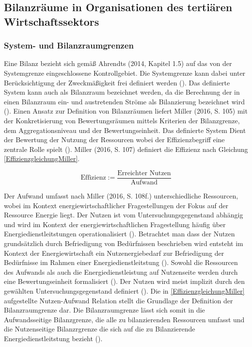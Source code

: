 \subsection{Bilanzräume in Organisationen des tertiären Wirtschaftssektors}


\subsubsection{System- und Bilanzraumgrenzen}
Eine Bilanz bezieht sich gemäß Ahrendts (2014, Kapitel 1.5) auf das von der Systemgrenze eingeschlossene Kontrollgebiet. 
Die Systemgrenze kann dabei unter Berücksichtigung der Zweckmäßigkeit frei definiert werden (\cite[Kapitel 1.5]{Ahrendts.2014}).
Das definierte System kann auch als Bilanzraum bezeichnet werden, da die Berechnung der in einen Bilanzraum ein- und austretenden Ströme als Bilanzierung bezeichnet wird (\cite[S. 65]{Rönsch.2015}).
Einen Ansatz zur Definition von Bilanzräumen liefert Miller (2016, S. 105) mit der Konkretisierung von Bewertungsräumen mittels Kriterien der Bilanzgrenze, dem 
Aggregationsniveau und der Bewertungseinheit. Das definierte System Dient der Bewertung der Nutzung der Ressourcen wobei der Effizienzbegriff eine zentrale Rolle spielt (\cite[S. 107]{Miller.2016}).
Miller (2016, S. 107) definiert die Effizienz nach Gleichung \eqref{EffizienzgleichungMiller}.

\begin{equation}
    \text{Effizienz} := \frac{\text{Erreichter Nutzen}}{\text{Aufwand}}
    \label{EffizienzgleichungMiller}
\end{equation}

Der Aufwand umfasst nach Miller (2016, S. 108f.) unterschiedliche Ressourcen, wobei im Kontext energiewirtschaftlicher Fragestellungen der Fokus auf der Ressource Energie 
liegt.
Der Nutzen ist vom Untersuchungsgegenstand abhängig und wird im Kontext der energiewirtschaftlichen 
Fragestellung häufig über Energiedienstleitstungen operationalisiert (\cite[S. 107]{Miller.2016}). Betrachtet man dass der Nutzen grundsätzlich durch Befriedigung 
von Bedürfnissen beschrieben wird entsteht im Kontext der Energiewirtschaft ein Nutzenergiebedarf zur Befriedigung der Bedürfnisse im Rahmen einer Energiedienstleitstung 
(\cite[S. 107]{Miller.2016}). 
Sowohl die Ressourcen des Aufwands als auch die Energiedienstleistung auf Nutzenseite werden durch eine Bewertungseinheit formalisiert (\cite{Miller.2016}).
Der Nutzen wird meist implizit durch den gewählten Untersuchungsgegenstand definiert (\cite[S. 110]{Miller.2016}).
Die in \eqref{EffizienzgleichungMiller} aufgestellte Nutzen-Aufwand Relation stellt die Grundlage der Definition der Bilanzraumgrenze dar. 
Die Bilanzraumgrenze lässt sich somit in die Aufwandsseitige Bilanzgrenze, die alle zu bilanzierenden Ressourcen umfasst und die Nutzenseitige Bilanzrgrenze die sich auf 
die zu Bilanzierende Energiedienstleitstung bezieht (\cite[S. 111]{Miller.2016}).  

